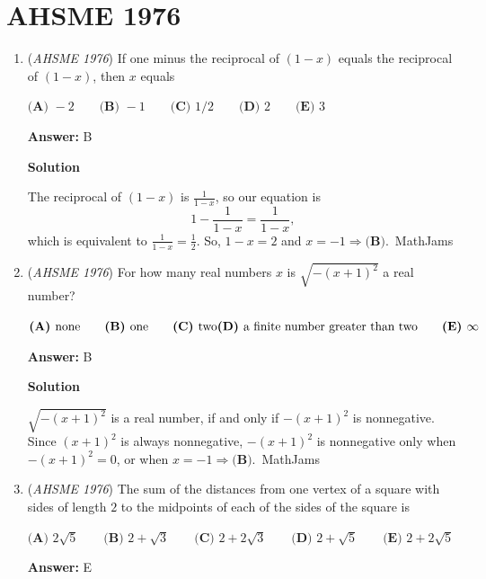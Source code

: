 \section{AHSME 1976}
        \begin{enumerate}
        	\item (\textit{AHSME 1976}) If one minus the reciprocal of $(1-x)$ equals the reciprocal of $(1-x)$, then $x$ equals


 $\textbf{(A) }-2\qquad \textbf{(B) }-1\qquad \textbf{(C) }1/2\qquad \textbf{(D) }2\qquad  \textbf{(E) }3$

 \textbf{Answer: }B



\textbf{Solution}

The reciprocal of $(1-x)$ is $\frac{1}{1-x}$, so our equation is 
 \[1-\frac{1}{1-x}=\frac{1}{1-x},\] which is equivalent to $\frac{1}{1-x}=\frac{1}{2}$. So, $1-x=2$ and $x=-1\Rightarrow \textbf{(B)}$.~MathJams

 


 


	\item (\textit{AHSME 1976}) For how many real numbers $x$ is $\sqrt{-(x+1)^2}$ a real number?


 $\textbf{(A) }\text{none}\qquad \textbf{(B) }\text{one}\qquad \textbf{(C) }\text{two}\qquad\\ \textbf{(D) }\text{a finite number greater than two}\qquad \textbf{(E) }\infty$

 \textbf{Answer: }B



\textbf{Solution}

$\sqrt{-(x+1)^2}$ is a real number, if and only if $-(x+1)^2$ is nonnegative. Since $(x+1)^2$ is always nonnegative, $-(x+1)^2$ is nonnegative only when $-(x+1)^2=0$, or when $x=-1 \Rightarrow \textbf{(B)}$.~MathJams

 


 


	\item (\textit{AHSME 1976}) The sum of the distances from one vertex of a square with sides of length $2$ to the midpoints of each of the sides of the square is


 $\textbf{(A) }2\sqrt{5}\qquad \textbf{(B) }2+\sqrt{3}\qquad \textbf{(C) }2+2\sqrt{3}\qquad \textbf{(D) }2+\sqrt{5}\qquad \textbf{(E) }2+2\sqrt{5}$

 \textbf{Answer: }E




\end{enumerate}

